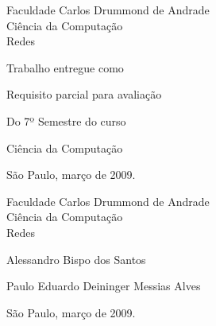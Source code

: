 
\thispagestyle{empty}

\begin{center}

 {\huge Faculdade Carlos Drummond de Andrade \\

 Ciência da Computação \\ [30mm]

 Redes} \\ [75mm]

\end{center}

\hspace{8cm} Trabalho entregue como 

\hspace{8cm} Requisito parcial para avaliação 

\hspace{8cm} Do 7º Semestre do curso 

\hspace{8cm} Ciência da Computação

\begin{center}
 \vfill São Paulo, março de 2009.
\end{center}

\newpage

\thispagestyle{empty}

\begin{center}

 {\huge Faculdade Carlos Drummond de Andrade \\

 Ciência da Computação \\ [30mm]

  Redes} \\ [75mm]

\end{center}

\hspace{8cm} Alessandro Bispo dos Santos

\hspace{8cm} Paulo Eduardo Deininger Messias Alves

\begin{center}
 \vfill São Paulo, março de 2009.
\end{center}

\newpage

\thispagestyle{empty}

